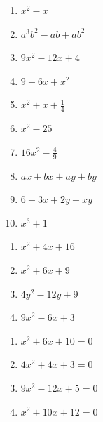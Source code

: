 \begin{exercicios}


\begin{multicols}{2}
\begin{enumerate}[label=\alph*)]
\item $x^2-x$

\item $a^3b^2-ab+ab^2$

\item $9x^2-12x+4$

\item $9+6x+x^2$

\item $x^2+x+\frac{1}{4}$

\item $x^2-25$

\item $16x^2-\frac{4}{9}$

\item $ax+bx+ay+by$

\item $6+3x+2y+xy$

\item $x^3+1$
\end{enumerate}
\end{multicols}


\begin{multicols}{2}
\begin{enumerate}[label=\alph*)]
\item $x^2+4x+16$

\item $x^2+6x+9$

\item $4y^2-12y+9$

\item $9x^2-6x+3$
\end{enumerate}
\end{multicols}


\begin{multicols}{2}
\begin{enumerate}[label=\alph*)]
\item $x^2 +6x + 10 = 0$

\item $4x^2 +4x + 3 = 0 $

\item $9x^2 - 12x + 5  = 0$

\item $x^2 + 10x + 12  = 0$
\end{enumerate}
\end{multicols}

\end{exercicios}

